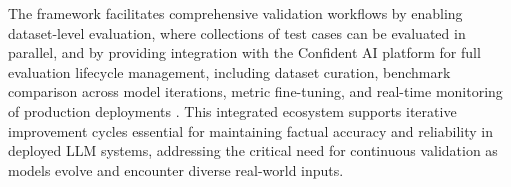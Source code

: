 The framework facilitates comprehensive validation workflows by enabling dataset-level evaluation, where collections of test cases can be evaluated in parallel, and by providing integration with the Confident AI platform for full evaluation lifecycle management, including dataset curation, benchmark comparison across model iterations, metric fine-tuning, and real-time monitoring of production deployments \cite{deepeval2023}. This integrated ecosystem supports iterative improvement cycles essential for maintaining factual accuracy and reliability in deployed LLM systems, addressing the critical need for continuous validation as models evolve and encounter diverse real-world inputs.